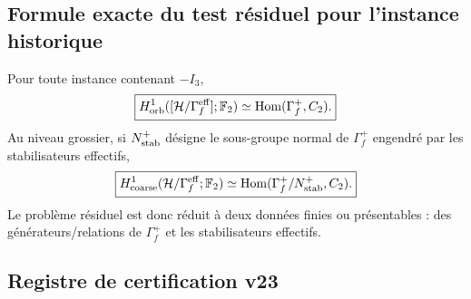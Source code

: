\documentclass[11pt,a4paper]{article}
\begin{document}
\subsection{Formule exacte du test résiduel pour l'instance historique}

Pour toute instance contenant $-I_3$,
\[
 \boxed{H^1_{\rm orb}([\mathcal H/\Gamma_f^{\rm eff}];\mathbb F_2)\simeq\operatorname{Hom}(\Gamma_f^+,C_2).}
\]
Au niveau grossier, si $N_{\rm stab}^+$ désigne le sous-groupe normal de $\Gamma_f^+$ engendré par les stabilisateurs effectifs,
\begin{equation}\label{eq:v23-coarse-residual}
 \boxed{H^1_{\rm coarse}(\mathcal H/\Gamma_f^{\rm eff};\mathbb F_2)\simeq\operatorname{Hom}(\Gamma_f^+/N_{\rm stab}^+,C_2).}
\end{equation}
Le problème résiduel est donc réduit à deux données finies ou présentables : des générateurs/relations de $\Gamma_f^+$ et les stabilisateurs effectifs.

\subsection{Registre de certification v23}
\end{document}
